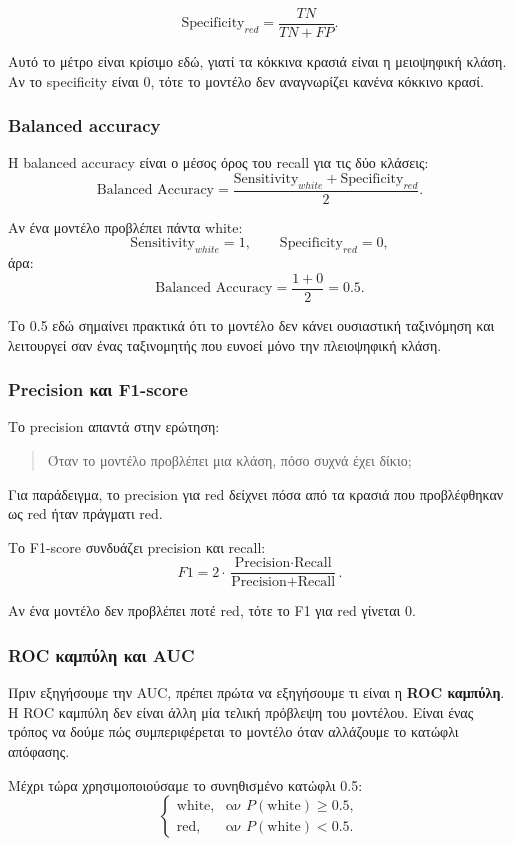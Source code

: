 \documentclass[11pt,a4paper]{article}
\begin{document}
\[
\text{Specificity}_{red} =
\frac{TN}{TN + FP}.
\]

Αυτό το μέτρο είναι κρίσιμο εδώ, γιατί τα κόκκινα κρασιά είναι η μειοψηφική
κλάση. Αν το specificity είναι 0, τότε το μοντέλο δεν αναγνωρίζει κανένα
κόκκινο κρασί.

\subsubsection{Balanced accuracy}

Η balanced accuracy είναι ο μέσος όρος του recall για τις δύο κλάσεις:
\[
\text{Balanced Accuracy} =
\frac{\text{Sensitivity}_{white} + \text{Specificity}_{red}}{2}.
\]

Αν ένα μοντέλο προβλέπει πάντα white:
\[
\text{Sensitivity}_{white} = 1, \qquad
\text{Specificity}_{red} = 0,
\]
άρα:
\[
\text{Balanced Accuracy} = \frac{1 + 0}{2} = 0.5.
\]

Το 0.5 εδώ σημαίνει πρακτικά ότι το μοντέλο δεν κάνει ουσιαστική
ταξινόμηση και λειτουργεί σαν ένας ταξινομητής που ευνοεί μόνο την
πλειοψηφική κλάση.

\subsubsection{Precision και F1-score}

Το precision απαντά στην ερώτηση:
\begin{quote}
Όταν το μοντέλο προβλέπει μια κλάση, πόσο συχνά έχει δίκιο;
\end{quote}

Για παράδειγμα, το precision για red δείχνει πόσα από τα κρασιά που
προβλέφθηκαν ως red ήταν πράγματι red.

Το F1-score συνδυάζει precision και recall:
\[
F1 = 2 \cdot
\frac{\text{Precision} \cdot \text{Recall}}
{\text{Precision} + \text{Recall}}.
\]

Αν ένα μοντέλο δεν προβλέπει ποτέ red, τότε το F1 για red γίνεται 0.

\subsubsection{ROC καμπύλη και AUC}

Πριν εξηγήσουμε την AUC, πρέπει πρώτα να εξηγήσουμε τι είναι η
\textbf{ROC καμπύλη}. Η ROC καμπύλη δεν είναι άλλη μία τελική πρόβλεψη του
μοντέλου. Είναι ένας τρόπος να δούμε πώς συμπεριφέρεται το μοντέλο όταν
αλλάζουμε το κατώφλι απόφασης.

Μέχρι τώρα χρησιμοποιούσαμε το συνηθισμένο κατώφλι 0.5:
\[
\begin{cases}
\text{white}, & \text{αν } P(\text{white}) \ge 0.5,\\
\text{red}, & \text{αν } P(\text{white}) < 0.5.
\end{cases}
\]
\end{document}
